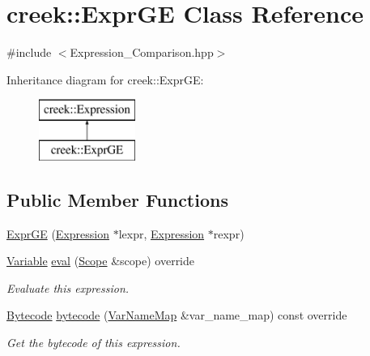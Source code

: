 \hypertarget{classcreek_1_1_expr_g_e}{}\section{creek\+:\+:Expr\+GE Class Reference}
\label{classcreek_1_1_expr_g_e}


{\ttfamily \#include $<$Expression\+\_\+\+Comparison.\+hpp$>$}

Inheritance diagram for creek\+:\+:Expr\+GE\+:\begin{figure}[H]
\begin{center}
\leavevmode
\includegraphics[height=2.000000cm]{classcreek_1_1_expr_g_e}
\end{center}
\end{figure}
\subsection*{Public Member Functions}
\begin{DoxyCompactItemize}
\item 
\hyperlink{classcreek_1_1_expr_g_e_afead8cd6f0aac0d01e0a45a1762eb7c0}{Expr\+GE} (\hyperlink{classcreek_1_1_expression}{Expression} $\ast$lexpr, \hyperlink{classcreek_1_1_expression}{Expression} $\ast$rexpr)
\item 
\hyperlink{classcreek_1_1_variable}{Variable} \hyperlink{classcreek_1_1_expr_g_e_a3345b3022a238af6b09ae9fa1bd1584f}{eval} (\hyperlink{classcreek_1_1_scope}{Scope} \&scope) override
\begin{DoxyCompactList}\small\item\em Evaluate this expression. \end{DoxyCompactList}\item 
\hyperlink{classcreek_1_1_bytecode}{Bytecode} \hyperlink{classcreek_1_1_expr_g_e_a9b87dca5b84909cf71cfc8befe623f2d}{bytecode} (\hyperlink{classcreek_1_1_var_name_map}{Var\+Name\+Map} \&var\+\_\+name\+\_\+map) const  override\hypertarget{classcreek_1_1_expr_g_e_a9b87dca5b84909cf71cfc8befe623f2d}{}\label{classcreek_1_1_expr_g_e_a9b87dca5b84909cf71cfc8befe623f2d}

\begin{DoxyCompactList}\small\item\em Get the bytecode of this expression. \end{DoxyCompactList}\end{DoxyCompactItemize}


